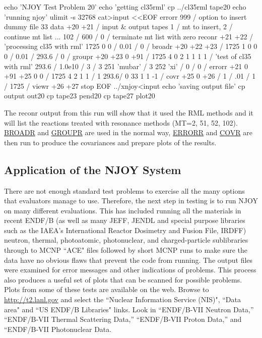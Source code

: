 \small
\begin{ccode}

echo 'NJOY Test Problem 20'
echo 'getting cl35rml'
cp ../cl35rml tape20
echo 'running njoy'
ulimit -s 32768
cat>input <<EOF
errorr
 999     /  option to insert dummy file 33 data
 +20 +21 /  input & output tapes
   1     /  mt to insert,
   2     /  continue mt list ...
 102     /
 600     /
   0     /  terminate mt list with zero
reconr
 +21 +22 /
 'processing cl35 with rml'
 1725 0 0 /
 0.01 /
 0 /
broadr
 +20 +22 +23 /
 1725 1 0 0 0 /
 0.01 /
 293.6 /
 0 /
groupr
 +20 +23 0 +91 /
 1725 4 0 2 1 1 1 1 /
 'test of cl35 with rml'
 293.6 /
 1.0e10 /
 3 /
 3 251 'mubar' /
 3 252 'xi' /
 0 /
 0 /
errorr
 +21 0 +91 +25 0 0 /
 1725 4 2 1 1 /
 1 293.6/
 0 33 1 1 -1 /
covr
 +25 0 +26 /
 1 /
 .01 /
 1 /
 1725 /
viewr
 +26 +27
stop
EOF
../xnjoy<input
echo 'saving output file'
cp output out20
cp tape23 pend20
cp tape27 plot20

\end{ccode}
\normalsize

The reconr output from this run will show that it used the RML
methods and it will list the reactions treated with resonance
methods (MT=2, 51, 52, 102).  \hyperlink{sBROADRhy}{BROADR}
and \hyperlink{sGROUPRhy}{GROUPR} are used in the normal way,
\hyperlink{sERRORRhy}{ERRORR} and \hyperlink{sCOVRhy}{COVR}
are then run to produce the covariances and prepare plots of the
results.


\subsection{Application of the NJOY System}
\label{ssMandT_application}

There are not enough standard test problems to exercise all the many
options that evaluators manage to use.  Therefore, the next step
in testing is to run NJOY on many different evaluations.  This
has included running all the materials in recent ENDF/B (as well as
many JEFF, JENDL and special purpose libraries such as the IAEA's
International Reactor Dosimetry and Fusion File, IRDFF) neutron,
thermal, photoatomic, photonuclear, and charged-particle
sublibraries through to MCNP ``ACE" files followed by
short MCNP runs to make sure the data have no obvious flaws
that prevent the code from running.  The output files were examined
for error messages and other indications of problems.
This process also produces a useful set of plots that can be
scanned for possible problems.  Plots from some of these
tests are available on the web.  Browse to
\href{http://t2.lanl.gov}{http://t2.lanl.gov} and select the
``Nuclear Information Service (NIS)", ``Data area"
and ``US ENDF/B Libraries" links.
Look in ``ENDF/B-VII Neutron Data,'' ``ENDF/B-VII Thermal
Scattering Data,'' ``ENDF/B-VII Proton Data,'' and ``ENDF/B-VII
Photonuclear Data.

